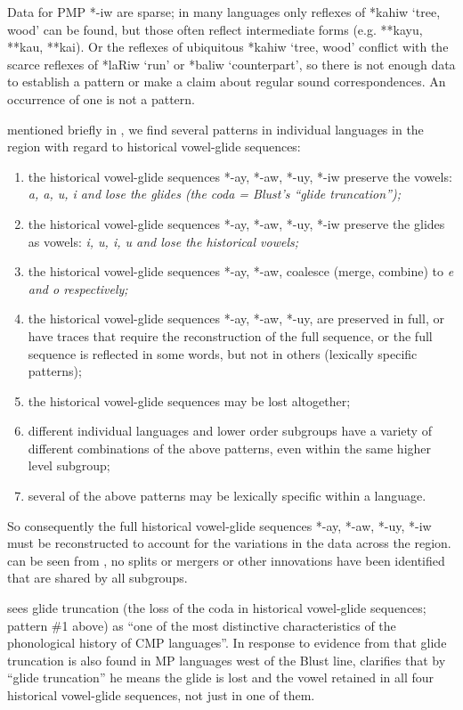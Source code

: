 Data for PMP *-iw are sparse; in many languages only reflexes
of *kahiw ‘tree, wood’ can be found,
but those often reflect intermediate forms (e.g. **kayu, **kau, **kai).
Or the reflexes of ubiquitous *kahiw ‘tree,
wood’ conflict with the scarce reflexes of *laRiw ‘run’ or *baliw
‘counterpart’, so there is not enough data to establish a pattern or make a
claim about regular sound correspondences.
An occurrence of one is not a pattern.

 mentioned briefly in ,
we find several patterns in individual languages in the region
with regard to historical vowel-glide sequences:

\begin{enumerate}
	\item	the historical vowel-glide sequences *-ay,
				*-aw, *-uy, *-iw preserve the vowels: \it{a,
				a, u, i} and lose the glides (the coda = Blust’s “glide truncation”);
	\item	the historical vowel-glide sequences *-ay,
				*-aw, *-uy, *-iw preserve the glides as vowels: \it{i,
				u, i, u} and lose the historical vowels;
	\item	the historical vowel-glide sequences *-ay,
				*-aw, coalesce (merge, combine) to \it{e}
				and \it{o} respectively; \item	the historical vowel-glide sequences
				*-ay, *-aw, *-uy, are preserved in full,
				or have traces that require the reconstruction of the full sequence,
				or the full sequence is reflected in some words,
				but not in others (lexically specific patterns);
	\item	the historical vowel-glide sequences may be lost altogether;
	\item	different individual languages
				and lower order subgroups have a variety of different combinations
				of the above patterns,
				even within the same higher level subgroup;
	\item	several of the above patterns may be lexically specific within a language.
\end{enumerate}

So consequently the full historical vowel-glide sequences *-ay,
*-aw, *-uy, *-iw must be reconstructed to account for the variations
in the data across the region.
 can be seen from ,
no splits or mergers or other innovations have been identified
that are shared by all subgroups.

\citet[264]{Blust1993} sees glide truncation (the loss of the
coda in historical vowel-glide sequences; pattern {\#}1 above)
as “one of the most distinctive characteristics of the phonological
history of CMP languages”.
In response to evidence from \citet{Nothofer1992} that glide
truncation is also found in MP languages west of the Blust line,
\citet[266]{Blust1993} clarifies that by “glide truncation” he
means the glide is lost
and the vowel retained in all four historical vowel-glide sequences,
not just in one of them.

